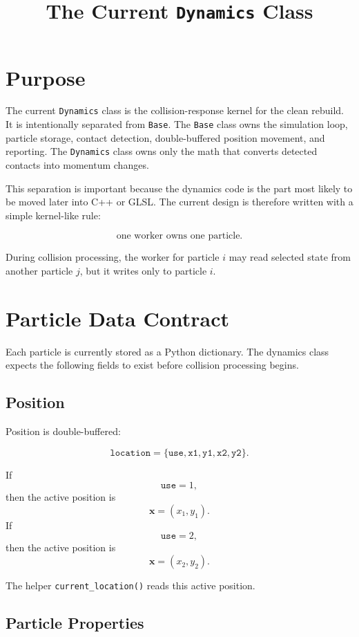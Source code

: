 \documentclass[11pt]{article}
\title{The Current \texttt{Dynamics} Class}
\author{}
\date{}
\begin{document}
\maketitle

\section{Purpose}

The current \texttt{Dynamics} class is the collision-response kernel for the
clean rebuild. It is intentionally separated from \texttt{Base}. The
\texttt{Base} class owns the simulation loop, particle storage, contact
detection, double-buffered position movement, and reporting. The
\texttt{Dynamics} class owns only the math that converts detected contacts into
momentum changes.

This separation is important because the dynamics code is the part most likely
to be moved later into C++ or GLSL. The current design is therefore written with
a simple kernel-like rule:

\[
    \text{one worker owns one particle}.
\]

During collision processing, the worker for particle \(i\) may read selected
state from another particle \(j\), but it writes only to particle \(i\).

\section{Particle Data Contract}

Each particle is currently stored as a Python dictionary. The dynamics class
expects the following fields to exist before collision processing begins.

\subsection{Position}

Position is double-buffered:

\[
\texttt{location}
=
\{
\texttt{use},\texttt{x1},\texttt{y1},\texttt{x2},\texttt{y2}
\}.
\]

If
\[
    \texttt{use}=1,
\]
then the active position is
\[
    \mathbf{x}=(x_1,y_1).
\]
If
\[
    \texttt{use}=2,
\]
then the active position is
\[
    \mathbf{x}=(x_2,y_2).
\]

The helper \texttt{current\_location()} reads this active position.

\subsection{Particle Properties}
\end{document}
